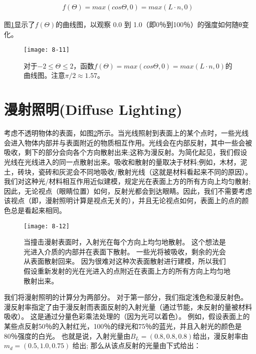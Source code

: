\begin{align*}
f(\Theta)=max(cos\Theta,0)=max(L\cdot n, 0)
\end{align*}

\begin{flushleft}
图\ref{fig:8-11}显示了$f(\Theta)$的曲线图，以观察 0.0 到 1.0（即0％到100％）的强度如何随θ变化。
\end{flushleft}

\begin{figure}[h]
    \texttt{[image: 8-11]}
    \centering
    \caption{对于$-2\leq \Theta \leq 2$，函数$f(\Theta)=max(cos\Theta,0)=max(L\cdot n, 0)$的曲线图。注意$\pi /2 \approx 1.57$。}
    \label{fig:8-11}
\end{figure}

\section{漫射照明(Diffuse Lighting)}
\begin{flushleft}
考虑不透明物体的表面，如图\ref{fig:8-12}所示。当光线照射到表面上的某个点时，一些光线会进入物体内部并与表面附近的物质相互作用。光线会在内部反射，其中一些会被吸收，剩下的部分会向各个方向散射出来;这称为漫反射。为简化起见，我们假设光线在光线进入的同一点散射出来。吸收和散射的量取决于材料;例如，木材，泥土，砖块，瓷砖和灰泥会不同地吸收/散射光线（这就是材料看起来不同的原因）。我们对这种光/材料相互作用近似建模，规定光在表面上方的所有方向上均匀散射;因此，无论视点（眼睛位置）如何，反射光都会到达眼睛。因此，我们不需要考虑该视点（即，漫射照明计算是视点无关的），并且无论视点如何，表面上的点的颜色总是看起来相同。\\
\end{flushleft}

\begin{figure}[h]
    \texttt{[image: 8-12]}
    \centering
    \caption{当撞击漫射表面时，入射光在每个方向上均匀地散射。 这个想法是光进入介质的内部并在表面下散射。 一些光将被吸收，剩余的光会从表面散射回来。 因为很难对这种次表面散射进行建模，所以我们假设重新发射的光在光进入的点附近在表面上方的所有方向上均匀地散射出来。}
    \label{fig:8-12}
\end{figure}

\begin{flushleft}
我们将漫射照明的计算分为两部分。 对于第一部分，我们指定浅色和漫反射色。 漫反射率指定了由于漫反射而表面反射的入射光量（通过节能，未反射的量被材料吸收）。 这是通过分量色彩乘法处理的（因为光可以着色）。 例如，假设表面上的某些点反射50％的入射红光，100％的绿光和75％的蓝光，并且入射光的颜色是80％强度的白光。 也就是说，入射光量由$B_{L}=(0.8,0.8,0.8)$给出，漫反射率由$m_{d}=(0.5,1.0,0.75)$ 给出; 那么从该点反射的光量由下式给出：\\
\end{flushleft}

